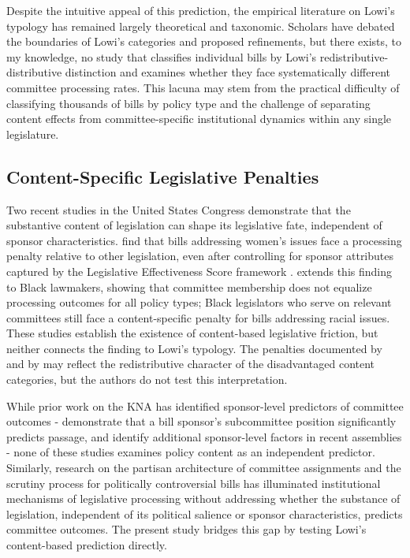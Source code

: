 \documentclass[11pt]{article}
\begin{document}
Despite the intuitive appeal of this prediction, the empirical literature on Lowi's typology has remained largely theoretical and taxonomic. Scholars have debated the boundaries of Lowi's categories and proposed refinements, but there exists, to my knowledge, no study that classifies individual bills by Lowi's redistributive-distributive distinction and examines whether they face systematically different committee processing rates. This lacuna may stem from the practical difficulty of classifying thousands of bills by policy type and the challenge of separating content effects from committee-specific institutional dynamics within any single legislature.

\subsection{Content-Specific Legislative Penalties}
\label{sec:lit-content}

Two recent studies in the United States Congress demonstrate that the substantive content of legislation can shape its legislative fate, independent of sponsor characteristics. \citet{volden2016} find that bills addressing women's issues face a processing penalty relative to other legislation, even after controlling for sponsor attributes captured by the Legislative Effectiveness Score framework \citep{volden2014}. \citet{peay2020} extends this finding to Black lawmakers, showing that committee membership does not equalize processing outcomes for all policy types; Black legislators who serve on relevant committees still face a content-specific penalty for bills addressing racial issues. These studies establish the existence of content-based legislative friction, but neither connects the finding to Lowi's typology. The penalties documented by \citeauthor{volden2016} and by \citeauthor{peay2020} may reflect the redistributive character of the disadvantaged content categories, but the authors do not test this interpretation.

While prior work on the KNA has identified sponsor-level predictors of committee outcomes - \citet{kim2023} demonstrate that a bill sponsor's subcommittee position significantly predicts passage, and \citet{an2025} identify additional sponsor-level factors in recent assemblies - none of these studies examines policy content as an independent predictor. Similarly, research on the partisan architecture of committee assignments \citep{choi2018} and the scrutiny process for politically controversial bills \citep{seo2020, jeong2024} has illuminated institutional mechanisms of legislative processing without addressing whether the substance of legislation, independent of its political salience or sponsor characteristics, predicts committee outcomes. The present study bridges this gap by testing Lowi's content-based prediction directly.
\end{document}
